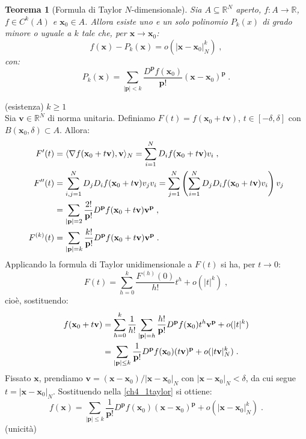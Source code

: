 \documentclass[a4paper,12pt]{report}
\theoremstyle{plain}
\newtheorem{thm}{Teorema}[section]
\theoremstyle{definition}
\theoremstyle{remark}
\numberwithin{equation}{section}
\begin{document}
\begin{thm}[Formula di Taylor $N$-dimensionale] Sia $A \subseteq \mathbb{R}^N$ aperto, $f:A \to \mathbb{R}$, $f \in C^k(A)$ e $\mathbf{x}_0 \in A$. Allora esiste uno e un solo polinomio $P_k(x)$ di grado minore o uguale a $k$ tale che, per $\mathbf{x} \to \mathbf{x}_0$:
\begin{equation}
f(\mathbf{x})-P_k(\mathbf{x})=o\left(|\mathbf{x}-\mathbf{x}_0|_N^k\right)\;,
\end{equation}
con:
\begin{equation}
P_k(\mathbf{x})=\sum_{|\mathbf{p}|<k} \frac{D^{\mathbf{p}}f(\mathbf{x}_0)}{\mathbf{p}!}(\mathbf{x}-\mathbf{x}_0)^{\mathbf{p}}\;.
\end{equation}
\end{thm}
\proof (esistenza) $k \ge 1$ \\

Sia $\mathbf{v} \in \mathbb{R}^N$ di norma unitaria. Definiamo $F(t)=f(\mathbf{x}_0+t\mathbf{v})$, $t \in [-\delta,\delta]$ con 
$B(\mathbf{x}_0,\delta) \subset A$. Allora:
\begin{align}
F'(t) &= \langle \nabla f(\mathbf{x}_0+t\mathbf{v}),\mathbf{v}\rangle_N=\sum_{i=1}^N D_if(\mathbf{x}_0+t\mathbf{v})v_i\;, \\
F''(t) &= \sum_{i,j=1}^N D_jD_if(\mathbf{x}_0+t\mathbf{v})v_jv_i=\sum_{j=1}^N\left(\sum_{i=1}^N D_jD_if(\mathbf{x}_0+t\mathbf{v})v_i\right)v_j \notag \\
&= \sum_{|\mathbf{p}|=2}\frac{2!}{\mathbf{p}!}D^{\mathbf{p}}f(\mathbf{x}_0+t\mathbf{v})\mathbf{v}^{\mathbf{p}}\;, \\
F^{(k)}(t) &=\sum_{|\mathbf{p}|=k}\frac{k!}{\mathbf{p}!} D^{\mathbf{p}}f(\mathbf{x}_0+t\mathbf{v})\mathbf{v}^{\mathbf{p}}\;.
\end{align}
Applicando la formula di Taylor unidimensionale a $F(t)$ si ha, per $t \to 0$:
\begin{equation}
F(t)=\sum_{h=0}^k \frac{F^{(h)}(0)}{h!}t^h+o(|t|^k)\;,
\end{equation}
cioè, sostituendo:
\begin{align}
f(\mathbf{x}_0+t\mathbf{v}) &=\sum_{h=0}^k\frac{1}{h!}\sum_{|\mathbf{p}|=h} \frac{h!}{\mathbf{p}!}D^{\mathbf{p}}f(\mathbf{x}_0)t^h\mathbf{v}^{\mathbf{p}}+o(|t|^k) \notag \\
&=\sum_{|\mathbf{p}|\le k} \frac{1}{\mathbf{p}!}D^{\mathbf{p}}f(\mathbf{x}_0)(t\mathbf{v})^{\mathbf{p}}+o(|t\mathbf{v}|^k_N)\;. \label{ch4_1taylor}
\end{align}
Fissato $\mathbf{x}$, prendiamo $\mathbf{v}=(\mathbf{x}-\mathbf{x}_0)/|\mathbf{x}-\mathbf{x}_0|_N$ con $|\mathbf{x}-\mathbf{x}_0|_N< \delta$, da cui segue $t=|\mathbf{x}-\mathbf{x}_0|_N$. Sostituendo nella \eqref{ch4_1taylor} si ottiene:
\begin{equation}
f(\mathbf{x})=\sum_{|\mathbf{p}|\le k} \frac{1}{\mathbf{p}!}D^{\mathbf{p}}f(\mathbf{x}_0)(\mathbf{x}-\mathbf{x}_0)^{\mathbf{p}}+
o(|\mathbf{x}-\mathbf{x}_0|_N^k)\;.
\end{equation}
\endproof
\proof (unicità) \\
\end{document}
